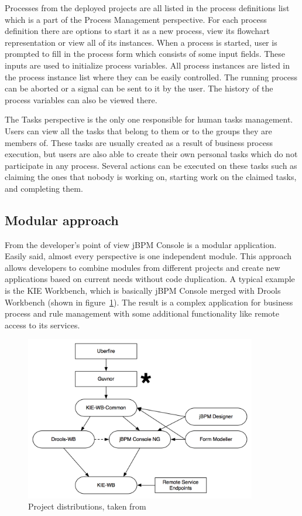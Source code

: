 \documentclass[12pt,oneside,final]{fithesis2}
\begin{document}
Processes from the deployed projects are all listed in the process definitions list which is a part of the Process Management perspective.
For each process definition there are options to start it as a new process, view its flowchart representation or view all of its instances.
When a process is started, user is prompted to fill in the process form which consists of some input fields.
These inputs are used to initialize process variables.
All process instances are listed in the process instance list where they can be easily controlled.
The running process can be aborted or a signal can be sent to it by the user.
The history of the process variables can also be viewed there.

The Tasks perspective is the only one responsible for human tasks management.
Users can view all the tasks that belong to them or to the groups they are members of.
These tasks are usually created as a result of business process execution, but users are also able to create their own personal tasks which do not participate in any process.
Several actions can be executed on these tasks such as claiming the ones that nobody is working on, starting work on the claimed tasks, and completing them.

\subsection{Modular approach}

From the developer's point of view jBPM Console is a modular application.
Easily said, almost every perspective is one independent module.
This approach allows developers to combine modules from different projects and create new applications based on current needs without code duplication.
A typical example is the KIE Workbench, which is basically jBPM Console merged with Drools Workbench (shown in figure~\ref{fig:project-structure}).
The result is a complex application for business process and rule management with some additional functionality like remote access to its services.

\begin{figure}[ht!]
\centering
\includegraphics[width=0.9\textwidth]{images/project-structure.png}
\caption{Project distributions, taken from \cite{salaboy13}}
\label{fig:project-structure}
\end{figure}
\end{document}
